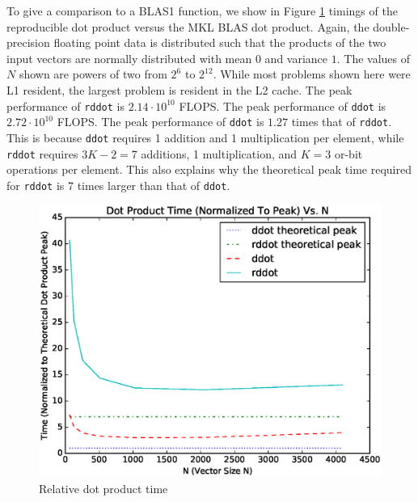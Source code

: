     To give a comparison to a BLAS1 function, we show in Figure \ref{fig:dot_timings} timings of the reproducible dot product versus the MKL BLAS dot product. Again, the double-precision floating point data is distributed such that the products of the two input vectors are normally distributed with mean $0$ and variance $1$. The values of $N$ shown are powers of two from $2^6$ to $2^{12}$. While most problems shown here were L1 resident, the largest problem is resident in the L2 cache. The peak performance of \texttt{rddot} is $2.14\cdot 10^{10}$ FLOPS. The peak performance of \texttt{ddot} is $2.72\cdot 10^{10}$ FLOPS. The peak performance of \texttt{ddot} is $1.27$ times that of \texttt{rddot}. This is because \texttt{ddot} requires 1 addition and 1 multiplication per element, while \texttt{rddot} requires $3K - 2 = 7$ additions, 1 multiplication, and $K = 3$ or-bit operations per element. This also explains why the theoretical peak time required for \texttt{rddot} is 7 times larger than that of \texttt{ddot}.
  \begin{figure}[H]
  \begin{center}
  \includegraphics[width=\textwidth]{plots/dot_comparison}
  \caption{Relative dot product time}
  \label{fig:dot_timings}
  \end{center}
  \end{figure}
